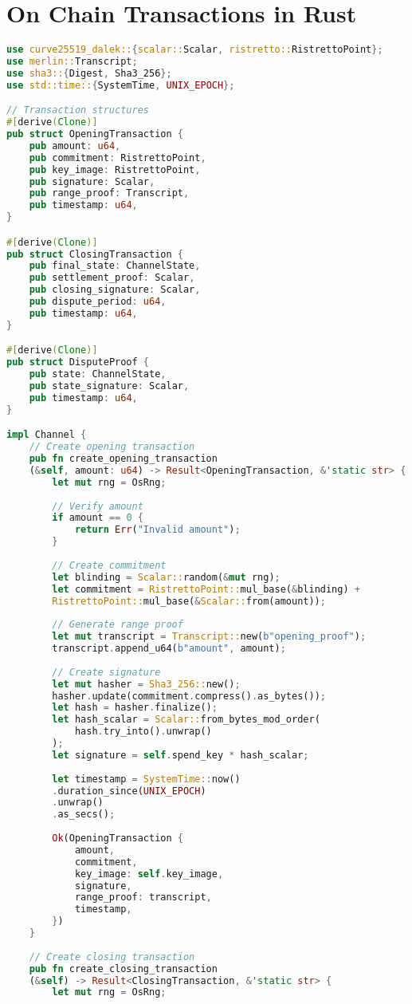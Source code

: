 \documentclass[11pt]{amsart}
\begin{document}
\section{On Chain Transactions in Rust}

\begin{lstlisting}[language=Rust]
use curve25519_dalek::{scalar::Scalar, ristretto::RistrettoPoint};
use merlin::Transcript;
use sha3::{Digest, Sha3_256};
use std::time::{SystemTime, UNIX_EPOCH};

// Transaction structures
#[derive(Clone)]
pub struct OpeningTransaction {
	pub amount: u64,
	pub commitment: RistrettoPoint,
	pub key_image: RistrettoPoint,
	pub signature: Scalar,
	pub range_proof: Transcript,
	pub timestamp: u64,
}

#[derive(Clone)]
pub struct ClosingTransaction {
	pub final_state: ChannelState,
	pub settlement_proof: Scalar,
	pub closing_signature: Scalar,
	pub dispute_period: u64,
	pub timestamp: u64,
}

#[derive(Clone)]
pub struct DisputeProof {
	pub state: ChannelState,
	pub state_signature: Scalar,
	pub timestamp: u64,
}

impl Channel {
	// Create opening transaction
	pub fn create_opening_transaction
	(&self, amount: u64) -> Result<OpeningTransaction, &'static str> {
		let mut rng = OsRng;
		
		// Verify amount
		if amount == 0 {
			return Err("Invalid amount");
		}
		
		// Create commitment
		let blinding = Scalar::random(&mut rng);
		let commitment = RistrettoPoint::mul_base(&blinding) + 
		RistrettoPoint::mul_base(&Scalar::from(amount));
		
		// Generate range proof
		let mut transcript = Transcript::new(b"opening_proof");
		transcript.append_u64(b"amount", amount);
		
		// Create signature
		let mut hasher = Sha3_256::new();
		hasher.update(commitment.compress().as_bytes());
		let hash = hasher.finalize();
		let hash_scalar = Scalar::from_bytes_mod_order(
			hash.try_into().unwrap()
		);
		let signature = self.spend_key * hash_scalar;
		
		let timestamp = SystemTime::now()
		.duration_since(UNIX_EPOCH)
		.unwrap()
		.as_secs();
		
		Ok(OpeningTransaction {
			amount,
			commitment,
			key_image: self.key_image,
			signature,
			range_proof: transcript,
			timestamp,
		})
	}
	
	// Create closing transaction
	pub fn create_closing_transaction
	(&self) -> Result<ClosingTransaction, &'static str> {
		let mut rng = OsRng;
		

\end{lstlisting}
\end{document}
